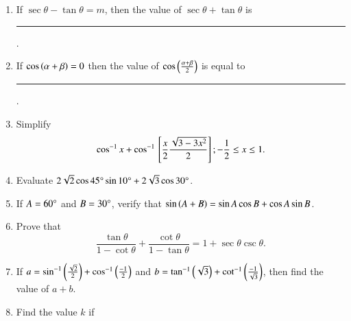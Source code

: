 \begin{enumerate}[label=\thesubsection.\arabic*,ref=\thesubsection.\theenumi,itemsep=1pt]
	 \hfill{}
\item If $\sec\theta - \tan\theta = m$, then the value of $\sec\theta + \tan\theta$ is \rule{1cm}{0.1pt}.
 \hfill{}\item If $\cos\left(\alpha + \beta\right) = 0$ then the value of $\cos\left(\frac{\alpha + \beta}{2}\right)$ is equal to \rule{1cm}{0.1pt}.
\hfill{}
\item Simplify $$\cos^{-1}x + \cos^{-1}{}\left[\frac{x}{2}{\frac{\sqrt{3-3x^2}}{2}}\right];-\frac{1}{2} \leq x \leq 1.$$
\hfill{}\item Evaluate $2\sqrt{2} \cos 45\degree \sin 10\degree + 2\sqrt{3} \cos 30\degree$.
\hfill{}\item If  $A = 60\degree$ and  $B = 30\degree$, verify that  $\sin\left(A + B\right) = \sin A \cos B + \cos A \sin B$.
\hfill{}\item Prove that  $$\frac{\tan{\theta}}{1 - \cot{\theta}} + \frac{\cot{\theta}}{1 - \tan{\theta}} = 1 + \sec
{\theta}\csc{\theta}.$$
\hfill{}
\item If $ a = \sin^{-1}\left(\frac{\sqrt{2}}{2}\right) + \cos^{-1}\left(\frac{-1}{2}\right) $ and $ b = \tan^{-1}\left(\sqrt{3}\right) + \cot^{-1}\left(\frac{-1}{\sqrt{3}}\right) $, then find the value of $a + b$.
\hfill{}\item Find the value $k$ if 
 

\end{enumerate}
